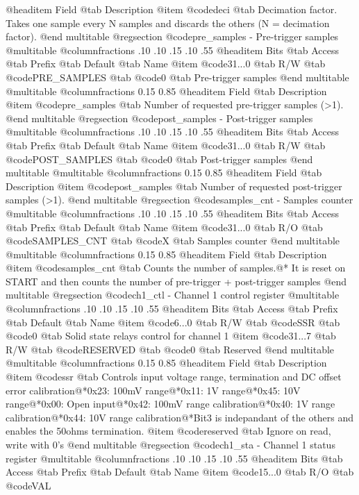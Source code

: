 @headitem Field @tab Description
@item @code{deci} @tab Decimation factor. Takes one sample every N samples and discards the others (N = decimation factor).
@end multitable
@regsection @code{pre_samples} - Pre-trigger samples
@multitable @columnfractions .10 .10 .15 .10 .55
@headitem Bits @tab Access @tab Prefix @tab Default @tab Name
@item @code{31...0}
@tab R/W @tab
@code{PRE_SAMPLES}
@tab @code{0} @tab 
Pre-trigger samples
@end multitable
@multitable @columnfractions 0.15 0.85
@headitem Field @tab Description
@item @code{pre_samples} @tab Number of requested pre-trigger samples (>1).
@end multitable
@regsection @code{post_samples} - Post-trigger samples
@multitable @columnfractions .10 .10 .15 .10 .55
@headitem Bits @tab Access @tab Prefix @tab Default @tab Name
@item @code{31...0}
@tab R/W @tab
@code{POST_SAMPLES}
@tab @code{0} @tab 
Post-trigger samples
@end multitable
@multitable @columnfractions 0.15 0.85
@headitem Field @tab Description
@item @code{post_samples} @tab Number of requested post-trigger samples (>1).
@end multitable
@regsection @code{samples_cnt} - Samples counter
@multitable @columnfractions .10 .10 .15 .10 .55
@headitem Bits @tab Access @tab Prefix @tab Default @tab Name
@item @code{31...0}
@tab R/O @tab
@code{SAMPLES_CNT}
@tab @code{X} @tab 
Samples counter
@end multitable
@multitable @columnfractions 0.15 0.85
@headitem Field @tab Description
@item @code{samples_cnt} @tab Counts the number of samples.@* It is reset on START and then counts the number of pre-trigger + post-trigger samples
@end multitable
@regsection @code{ch1_ctl} - Channel 1 control register
@multitable @columnfractions .10 .10 .15 .10 .55
@headitem Bits @tab Access @tab Prefix @tab Default @tab Name
@item @code{6...0}
@tab R/W @tab
@code{SSR}
@tab @code{0} @tab 
Solid state relays control for channel 1
@item @code{31...7}
@tab R/W @tab
@code{RESERVED}
@tab @code{0} @tab 
Reserved
@end multitable
@multitable @columnfractions 0.15 0.85
@headitem Field @tab Description
@item @code{ssr} @tab Controls input voltage range, termination and DC offset error calibration@*0x23: 100mV range@*0x11: 1V range@*0x45: 10V range@*0x00: Open input@*0x42: 100mV range calibration@*0x40: 1V range calibration@*0x44: 10V range calibration@*Bit3 is indepandant of the others and enables the 50ohms termination.
@item @code{reserved} @tab Ignore on read, write with 0's
@end multitable
@regsection @code{ch1_sta} - Channel 1 status register
@multitable @columnfractions .10 .10 .15 .10 .55
@headitem Bits @tab Access @tab Prefix @tab Default @tab Name
@item @code{15...0}
@tab R/O @tab
@code{VAL}
